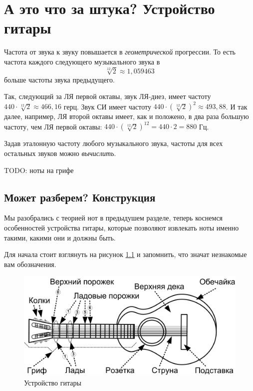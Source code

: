 \chapter{А это что за штука? Устройство гитары}
\label{ch:guitar}

Частота от звука к звуку повышается в \emph{геометрической} прогрессии. То есть частота каждого следующего музыкального звука в \[\sqrt[12]{2}\approx 1,059463\] больше частоты звука предыдущего.

Так, следующий за ЛЯ первой октавы, звук ЛЯ-диез, имеет частоту $440\cdot\sqrt[12]{2}\approx 466,16$ герц. Звук СИ имеет частоту $440\cdot(\sqrt[12]{2})^2\approx 493,88$. И так далее, например, ЛЯ второй октавы имеет, как и положено, в два раза большую частоту, чем ЛЯ первой октавы: $440\cdot(\sqrt[12]{2})^{12}=440\cdot 2=880$ Гц.

Задав эталонную частоту любого музыкального звука, частоты для всех остальных звуков можно \emph{вычислить}.


TODO: ноты на грифе

\section{Может разберем? Конструкция}
\label{ch:guitar:construction}

Мы разобрались с теорией нот в предыдушем разделе, теперь коснемся особенностей устройства гитары, которые позволяют извлекать ноты именно такими, какими они и должны быть. 

Для начала стоит взглянуть на рисунок \ref{fig:guitar:construction} и запомнить, что значат незнакомые вам обозначения.

\begin{figure}[!ht]
    \centering
    \includegraphics{fig/guitar-construction} 
    \caption{Устройство гитары}\label{fig:guitar:construction}
\end{figure} 

